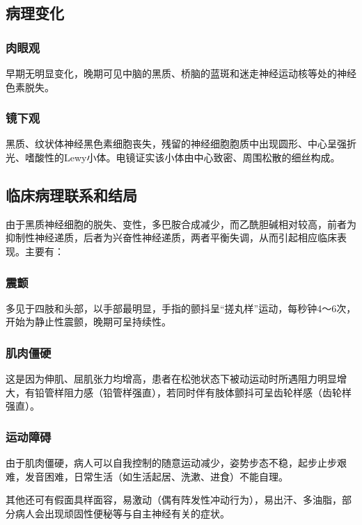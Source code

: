 \subsection{病理变化}

\subsubsection{肉眼观}

早期无明显变化，晚期可见中脑的黑质、桥脑的蓝斑和迷走神经运动核等处的神经色素脱失。

\subsubsection{镜下观}

黑质、纹状体神经黑色素细胞丧失，残留的神经细胞胞质中出现圆形、中心呈强折光、嗜酸性的Lewy小体。电镜证实该小体由中心致密、周围松散的细丝构成。

\subsection{临床病理联系和结局}

由于黑质神经细胞的脱失、变性，多巴胺合成减少，而乙酰胆碱相对较高，前者为抑制性神经递质，后者为兴奋性神经递质，两者平衡失调，从而引起相应临床表现。主要有：

\subsubsection{震颤}

多见于四肢和头部，以手部最明显，手指的颤抖呈“搓丸样”运动，每秒钟4～6次，开始为静止性震颤，晚期可呈持续性。

\subsubsection{肌肉僵硬}

这是因为伸肌、屈肌张力均增高，患者在松弛状态下被动运动时所遇阻力明显增大，有铅管样阻力感（铅管样强直），若同时伴有肢体颤抖可呈齿轮样感（齿轮样强直）。

\subsubsection{运动障碍}

由于肌肉僵硬，病人可以自我控制的随意运动减少，姿势步态不稳，起步止步艰难，发音困难，日常生活（如生活起居、洗漱、进食）不能自理。

其他还可有假面具样面容，易激动（偶有阵发性冲动行为），易出汗、多油脂，部分病人会出现顽固性便秘等与自主神经有关的症状。

